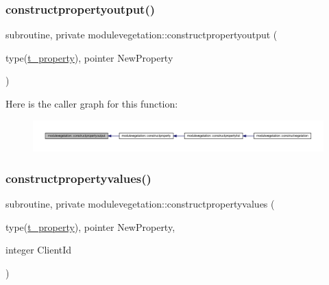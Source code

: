 \subsubsection{\texorpdfstring{constructpropertyoutput()}{constructpropertyoutput()}}
{\footnotesize\ttfamily subroutine, private modulevegetation\+::constructpropertyoutput (\begin{DoxyParamCaption}\item[{type(\mbox{\hyperlink{structmodulevegetation_1_1t__property}{t\+\_\+property}}), pointer}]{New\+Property }\end{DoxyParamCaption})\hspace{0.3cm}{\ttfamily [private]}}

Here is the caller graph for this function\+:\nopagebreak
\begin{figure}[H]
\begin{center}
\leavevmode
\includegraphics[width=350pt]{namespacemodulevegetation_a107cf428abfe6d2909a01c200803e576_icgraph}
\end{center}
\end{figure}
\mbox{\label{namespacemodulevegetation_ad3fa17b279df119d651bb732e62a4f43}} 
\subsubsection{\texorpdfstring{constructpropertyvalues()}{constructpropertyvalues()}}
{\footnotesize\ttfamily subroutine, private modulevegetation\+::constructpropertyvalues (\begin{DoxyParamCaption}\item[{type(\mbox{\hyperlink{structmodulevegetation_1_1t__property}{t\+\_\+property}}), pointer}]{New\+Property,  }\item[{integer}]{Client\+Id }\end{DoxyParamCaption})\hspace{0.3cm}{\ttfamily [private]}}

